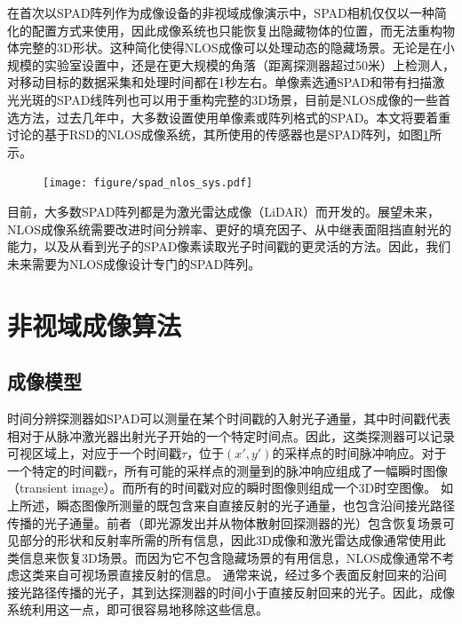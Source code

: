 \documentclass[master]{shtthesis}             %
\begin{document}
在首次以SPAD阵列作为成像设备的非视域成像演示中，SPAD相机仅仅以一种简化的配置方式来使用，因此成像系统也只能恢复出隐藏物体的位置，而无法重构物体完整的3D形状\citep{chan2017non}。这种简化使得NLOS成像可以处理动态的隐藏场景。无论是在小规模的实验室设置中，还是在更大规模的角落（距离探测器超过50米）上检测人\citep{gariepy2016detection}，对移动目标的数据采集和处理时间都在1秒左右。单像素选通SPAD\citep{buttafava2015non}和带有扫描激光光斑的SPAD线阵列\citep{o2017reconstructing}也可以用于重构完整的3D场景，目前是NLOS成像的一些首选方法，过去几年中，大多数设置使用单像素或阵列格式的SPAD。本文将要着重讨论的基于RSD的NLOS成像系统，其所使用的传感器也是SPAD阵列，如图\ref{fig:spad_nlos_sys_img}所示。

\begin{figure}[!tb]
  \centering
  \texttt{[image: figure/spad\_nlos\_sys.pdf]}
  \label{fig:spad_nlos_sys_img}
\end{figure}

目前，大多数SPAD阵列都是为激光雷达成像（LiDAR）而开发的。展望未来，NLOS成像系统需要改进时间分辨率、更好的填充因子、从中继表面阻挡直射光的能力，以及从看到光子的SPAD像素读取光子时间戳的更灵活的方法。因此，我们未来需要为NLOS成像设计专门的SPAD阵列。

\section{非视域成像算法}\label{sec:img_algo}

\subsection{成像模型}

时间分辨探测器如SPAD可以测量在某个时间戳的入射光子通量，其中时间戳代表相对于从脉冲激光器出射光子开始的一个特定时间点。因此，这类探测器可以记录可视区域上，对应于一个时间戳$\tau$，位于$(x',y')$的采样点的时间脉冲响应。对于一个特定的时间戳$\tau$，所有可能的采样点的测量到的脉冲响应组成了一幅瞬时图像（transient image）。而所有的时间戳对应的瞬时图像则组成一个3D时空图像。
如上所述，瞬态图像所测量的既包含来自直接反射的光子通量，也包含沿间接光路径传播的光子通量。前者（即光源发出并从物体散射回探测器的光）包含恢复场景可见部分的形状和反射率所需的所有信息，因此3D成像和激光雷达成像通常使用此类信息来恢复3D场景。而因为它不包含隐藏场景的有用信息，NLOS成像通常不考虑这类来自可视场景直接反射的信息。
通常来说，经过多个表面反射回来的沿间接光路径传播的光子，其到达探测器的时间小于直接反射回来的光子。因此，成像系统利用这一点，即可很容易地移除这些信息。
\end{document}
